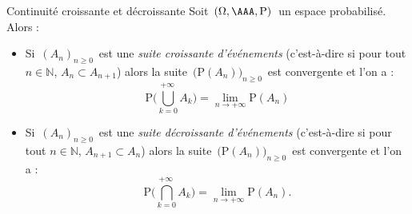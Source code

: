 \documentclass[french,11pt,twoside]{VcCours}
\renewcommand{\P}{\text{P}}
\begin{document}
\begin{Theoreme}{Continuité croissante et décroissante}
Soit $\,(\Omega , \AAA , \P)\,$ un espace probabilisé. Alors :



\begin{itemize}
\item Si $\,(A_n)_{n \geq 0}\,$ est une \emph{suite croissante d'événements} 
(c'est-à-dire si pour tout $n \in \mathbb{N}$, $A_n\subset A_{n+1}$) alors la suite $\,\big(\P(A_n)\big)_{n \geq 0}\,$ est convergente et l'on a :
$$\P\Big(\bigcup_{k=0}^{+\infty\ }A_k\Big) =\lim_{n\to+\infty}\P(A_n)$$
\item  Si $\,(A_n)_{n \geq 0}\,$ est une \emph{suite décroissante d'événements}
(c'est-à-dire si pour tout $n \in \mathbb{N}$,  $A_{n+1}\subset A_n$) alors la suite $\,\big(\P(A_n)\big)_{n \geq 0}\,$ est convergente et l'on a :
$$\P\Big(\bigcap_{k=0}^{+\infty\ }A_k\Big) = \lim\limits_{n\to+\infty}\P(A_n).$$
\end{itemize}
\end{Theoreme}
\end{document}

